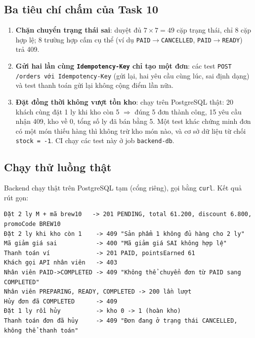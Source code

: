 \documentclass[12pt, a4paper]{article}
\begin{document}
\subsection{Ba tiêu chí chấm của Task 10}
\begin{enumerate}[label=(\alph*)]
  \item \textbf{Chặn chuyển trạng thái sai}:  duyệt đủ $7\times7=49$ cặp trạng thái, chỉ 8 cặp hợp lệ;
        8 trường hợp cấm cụ thể (ví dụ \texttt{PAID}$\rightarrow$\texttt{CANCELLED}, \texttt{PAID}$\rightarrow$\texttt{READY}) trả 409.
  \item \textbf{Gửi hai lần cùng \texttt{Idempotency-Key} chỉ tạo một đơn}: các test \texttt{POST /orders với Idempotency-Key}
        (gửi lại, hai yêu cầu cùng lúc, sai định dạng) và test thanh toán gửi lại không cộng điểm lần nữa.
  \item \textbf{Đặt đồng thời không vượt tồn kho}:  chạy trên PostgreSQL thật:
        20 khách cùng đặt 1 ly khi kho còn 5 $\Rightarrow$ đúng 5 đơn thành công, 15 yêu cầu nhận 409, kho về 0,
        tổng số ly đã bán bằng 5. Một test khác chứng minh đơn có một món thiếu hàng thì không trừ kho món nào,
        và cơ sở dữ liệu từ chối \texttt{stock = -1}. CI chạy các test này ở job \texttt{backend-db}.
\end{enumerate}

\subsection{Chạy thử luồng thật}
Backend chạy thật trên PostgreSQL tạm (cổng riêng), gọi bằng \texttt{curl}. Kết quả rút gọn:
\noindent\begin{minipage}{\textwidth}
\begin{Verbatim}[fontsize=\footnotesize, frame=lines, framerule=0.3pt, rulecolor=\color{sguline}]
Đặt 2 ly M + mã brew10   -> 201 PENDING, total 61.200, discount 6.800, promoCode BREW10
Đặt 2 ly khi kho còn 1    -> 409 "Sản phẩm 1 không đủ hàng cho 2 ly"
Mã giảm giá sai           -> 400 "Mã giảm giá SAI không hợp lệ"
Thanh toán ví             -> 201 PAID, pointsEarned 61
Khách gọi API nhân viên   -> 403
Nhân viên PAID->COMPLETED -> 409 "Không thể chuyển đơn từ PAID sang COMPLETED"
Nhân viên PREPARING, READY, COMPLETED -> 200 lần lượt
Hủy đơn đã COMPLETED      -> 409
Đặt 1 ly rồi hủy          -> kho 0 -> 1 (hoàn kho)
Thanh toán đơn đã hủy     -> 409 "Đơn đang ở trạng thái CANCELLED, không thể thanh toán"
\end{Verbatim}
\end{minipage}
\end{document}

